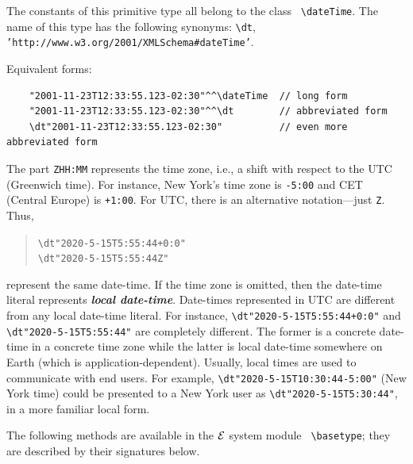 \documentclass[11pt]{article}
\newcommand{\ERGO}{\mbox{\ensuremath{\cal{E}}\smaller{{\sc{RGO}}}}\xspace}
\newcommand{\FLSYSTEM}{\ERGO}
\newcommand{\bs}{\textbackslash}
\begin{document}
\index{class!\bs{}dateTime}
The constants of this primitive type all belong to the class {\tt
  \bs{}dateTime}.  The name of this type has the following synonyms:
{\tt \bs{}dt},  {\tt 'http://www.w3.org/2001/XMLSchema\#dateTime'}. 

\noindent
Equivalent forms:
\begin{verbatim}
    "2001-11-23T12:33:55.123-02:30"^^\dateTime  // long form
    "2001-11-23T12:33:55.123-02:30"^^\dt        // abbreviated form
    \dt"2001-11-23T12:33:55.123-02:30"          // even more abbreviated form
\end{verbatim}

The part \texttt{ZHH:MM} represents the time zone, i.e., a shift with
respect to the UTC (Greenwich time). For instance, New York's time zone is
\texttt{-5:00} and CET (Central Europe) is \texttt{+1:00}.  For UTC, there
is an alternative notation---just \texttt{Z}. Thus,
\begin{quote}
 \verb|\dt"2020-5-15T5:55:44+0:0"|
 \\
 \verb|\dt"2020-5-15T5:55:44Z"| 
\end{quote}
represent the same date-time.  If the time zone is omitted, then the
date-time literal represents \emph{\textbf{local date-time}}.
Date-times represented in UTC are different from any local date-time literal.
For instance, \verb|\dt"2020-5-15T5:55:44+0:0"| and
\verb|\dt"2020-5-15T5:55:44"| are completely different. The former is a
concrete date-time in a concrete time zone while the latter is local date-time
somewhere on Earth (which is application-dependent).
Usually, local times are used to communicate with end users.
For example, \verb|\dt"2020-5-15T10:30:44-5:00"| (New York time) could be
presented to a New York user as \verb|\dt"2020-5-15T5:30:44"|, in a
more familiar local form.

\noindent
The following methods are available in the \FLSYSTEM system module {\tt
  \bs{}basetype}; they are described by their signatures below.
\end{document}
